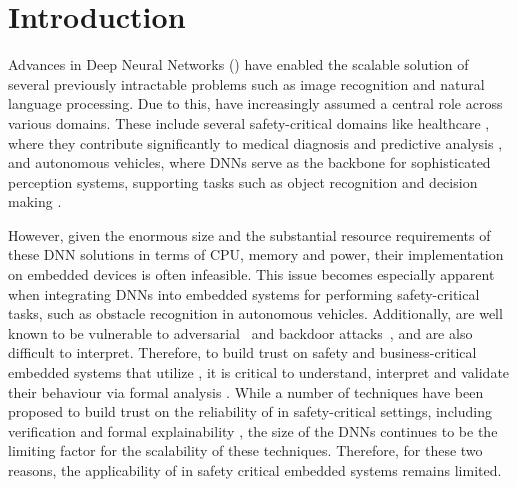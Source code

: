 
\section{Introduction}

Advances in Deep Neural Networks (\dnn) have enabled the scalable solution of
several previously intractable problems such as image recognition and natural
language processing. Due to this, \dnn have increasingly assumed a central role
across various domains. These include several safety-critical domains like
healthcare \cite{b1}, where they contribute significantly to medical
diagnosis and predictive analysis \cite{b2}, and autonomous vehicles, where
DNNs serve as the backbone for sophisticated perception systems, supporting
tasks such as object recognition and decision making \cite{b3}. 

However, given the enormous size and the substantial resource requirements of
these DNN solutions in terms of CPU, memory and power, their implementation
on embedded devices is often infeasible.  This issue
becomes especially apparent when integrating DNNs into embedded systems for
performing safety-critical tasks, such as obstacle recognition in autonomous
vehicles. Additionally, \dnn are well known to be vulnerable to
adversarial~\cite{l-bfgs,
fgsm, deep-fool, pgd, ground-truth-adv-attack, cw-attack} and backdoor
attacks~\cite{backdoor-poisoning}, and are also difficult to interpret.
Therefore, to build trust on safety and business-critical embedded systems
that utilize \dnn, it is critical to understand, interpret and validate their
behaviour via formal analysis \cite{overview-fxai, minimal-image-fxai,
backdoor-verification, nn-lander-verif, camera-verif-dsouza,
generalization-verif}. While a number of techniques have been proposed to build
trust on the reliability of \dnn in safety-critical settings, including
verification \cite{reluplex, deeppoly, crown, beta-crown, cegar-nn}  and formal
explainability \cite{overview-fxai, minimal-image-fxai}, the size of the DNNs
continues to be the limiting factor for the scalability of these techniques.
Therefore, for these two reasons, the applicability of \dnn in safety critical
 embedded systems remains limited.


